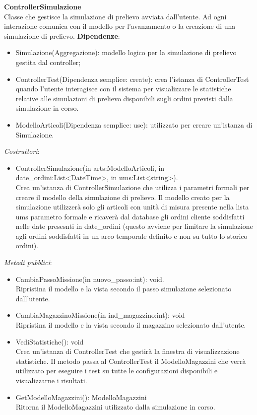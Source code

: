 \textbf{ControllerSimulazione}\\
Classe che gestisce la simulazione di prelievo avviata dall'utente. Ad ogni interazione comunica con il modello per l'avanzamento o la creazione di una simulazione di prelievo.
\textbf{Dipendenze}:
\begin{itemize}
    \item Simulazione(Aggregazione): modello logico per la simulazione di prelievo gestita dal controller;\\
    \item ControllerTest(Dipendenza semplice: create): crea l'istanza di ControllerTest quando l'utente interagisce con il sistema per visualizzare le statistiche relative 
    alle simulazioni di prelievo disponibili sugli ordini previsti dalla simulazione in corso.
    \item ModelloArticoli(Dipendenza semplice: use): utilizzato per creare un'istanza di Simulazione.
\end{itemize}
\textit{Costruttori}:\\
\begin{itemize}
    \item ControllerSimulazione(in arts:ModelloArticoli, in date\_ordini:List<DateTime>, in ums:List<string>).\\
    Crea un'istanza di ControllerSimulazione che utilizza i parametri formali per creare il modello della simulazione di prelievo.
    Il modello creato per la simulazione utilizzerà solo gli articoli con unità di misura presente nella lista ums parametro formale e ricaverà dal database gli ordini cliente 
    soddisfatti nelle date presesnti in date\_ordini (questo avviene per limitare la simulazione agli ordini soddisfatti in un arco temporale definito e non su tutto lo storico ordini).
\end{itemize}
\textit{Metodi pubblici}:\\
\begin{itemize}
    \item CambiaPassoMissione(in nuovo\_passo:int): void.\\
    Ripristina il modello e la vista secondo il passo simulazione selezionato dall'utente.
    \item CambiaMagazzinoMissione(in ind\_magazzino:int): void \\
    Ripristina il modello e la vista secondo il magazzino selezionato dall'utente.
    \item VediStatistiche(): void \\
    Crea un'istanza di ControllerTest che gestirà la finestra di visualizzazione statistiche.
    Il metodo passa al ControllerTest il ModelloMagazzini che verrà utilizzato per eseguire i test su tutte le configurazioni disponibili e visualizzarne i risultati.
    \item GetModelloMagazzini(): ModelloMagazzini \\
    Ritorna il ModelloMagazzini utilizzato dalla simulazione in corso.
\end{itemize} 
